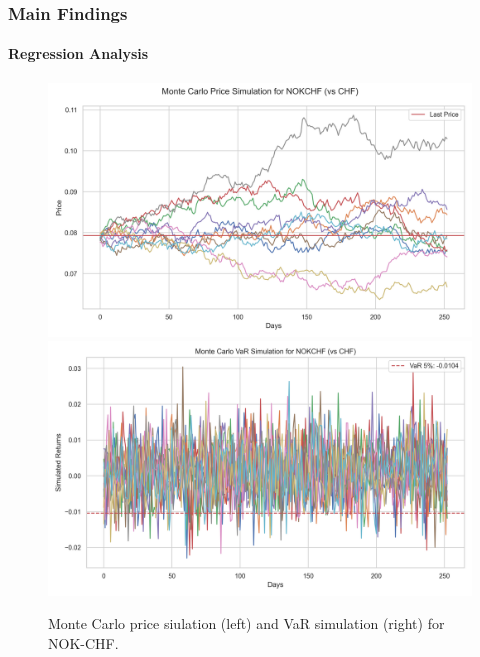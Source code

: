 \documentclass[10pt]{beamer}
\begin{document}
\begin{frame}
\frametitle{Main Findings}
\framesubtitle{Regression Analysis}

\begin{figure}
    \centering   \includegraphics[width=0.48\linewidth]{reports/figures/monte_carlo_price_simulation_NOKCHF_vs_CHF.png} \label{fig:monte_carlo_price_simulation_NOKCHF_vs_CHF}
    \includegraphics[width=0.48\linewidth]{reports/figures/monte_carlo_var_simulation_NOKCHF_vs_CHF.png} \label{fig:monte_carlo_var_simulation_NOKCHF_vs_CHF}
    \caption{\footnotesize Monte Carlo price siulation (left) and VaR simulation (right) for NOK-CHF.}
\end{figure}
\end{frame}
\end{document}
